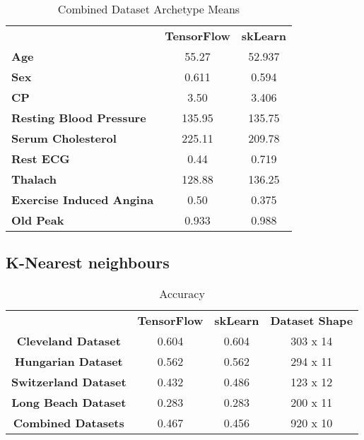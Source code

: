 \documentclass[conference]{IEEEtran}
\begin{document}
\FloatBarrier
\begin{table}[!htbp]
\caption{Combined Dataset Archetype Means}
\begin{center}
\begin{tabular}{|l|c|c|}
\hline
\textbf{ }&\textbf{TensorFlow}&\textbf{skLearn} \\
\cline{1-3} 
\textbf{Age} & 55.27 & 52.937 \\
\cline{1-3} 
\textbf{Sex} & 0.611 & 0.594 \\
\cline{1-3} 
\textbf{CP} & 3.50 & 3.406 \\
\cline{1-3} 
\textbf{Resting Blood Pressure} & 135.95 & 135.75 \\
\cline{1-3} 
\textbf{Serum Cholesterol} & 225.11 & 209.78 \\
\cline{1-3} 
\textbf{Rest ECG} & 0.44 & 0.719 \\
\cline{1-3} 
\textbf{Thalach} & 128.88 & 136.25 \\
\cline{1-3} 
\textbf{Exercise Induced Angina} & 0.50 & 0.375 \\
\cline{1-3} 
\textbf{Old Peak} & 0.933 & 0.988 \\
\cline{1-3} 
\hline
\end{tabular}
\label{tab5}
\end{center}
\end{table}
\FloatBarrier


\subsection{K-Nearest neighbours}
\FloatBarrier
\begin{table}[htbp]
\caption{Accuracy}
\begin{center}
\begin{tabular}{|c|c|c|c|}
\hline
\textbf{ }&\textbf{TensorFlow}&\textbf{skLearn} &\textbf{Dataset Shape} \\
\cline{1-4} 
\textbf{Cleveland Dataset} & 0.604 & 0.604 & {303 x 14} \\
\cline{1-4} 
\textbf{Hungarian Dataset} & 0.562 & 0.562 & {294 x 11} \\
\cline{1-4} 
\textbf{Switzerland Dataset} & 0.432 & 0.486 & {123 x 12} \\
\cline{1-4} 
\textbf{Long Beach Dataset} & 0.283 & 0.283 & {200 x 11 } \\
\cline{1-4} 
\textbf{Combined Datasets} & 0.467 & 0.456 & {920 x 10} \\
\cline{1-4} 
\hline
\end{tabular}
\label{tab6}
\end{center}
\end{table}
\FloatBarrier
\end{document}
